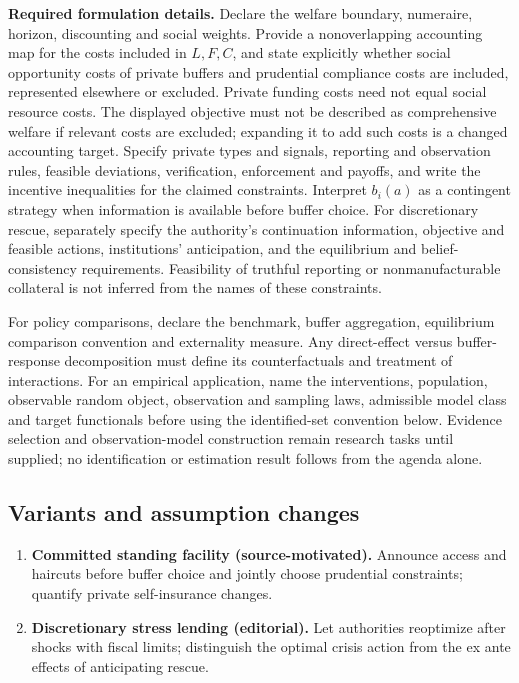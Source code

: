 \documentclass[11pt,a4paper]{article}
\begin{document}
\textbf{Required formulation details.} Declare the welfare boundary, numeraire, horizon, discounting and social weights. Provide a nonoverlapping accounting map for the costs included in \(L,F,C\), and state explicitly whether social opportunity costs of private buffers and prudential compliance costs are included, represented elsewhere or excluded. Private funding costs need not equal social resource costs. The displayed objective must not be described as comprehensive welfare if relevant costs are excluded; expanding it to add such costs is a changed accounting target. Specify private types and signals, reporting and observation rules, feasible deviations, verification, enforcement and payoffs, and write the incentive inequalities for the claimed constraints. Interpret \(b_i(a)\) as a contingent strategy when information is available before buffer choice. For discretionary rescue, separately specify the authority's continuation information, objective and feasible actions, institutions' anticipation, and the equilibrium and belief-consistency requirements. Feasibility of truthful reporting or nonmanufacturable collateral is not inferred from the names of these constraints.

For policy comparisons, declare the benchmark, buffer aggregation, equilibrium comparison convention and externality measure. Any direct-effect versus buffer-response decomposition must define its counterfactuals and treatment of interactions. For an empirical application, name the interventions, population, observable random object, observation and sampling laws, admissible model class and target functionals before using the identified-set convention below. Evidence selection and observation-model construction remain research tasks until supplied; no identification or estimation result follows from the agenda alone.
\subsection*{Variants and assumption changes}
\begin{enumerate}
\item \textbf{Committed standing facility (source-motivated).} Announce access and haircuts before buffer choice and jointly choose prudential constraints; quantify private self-insurance changes.
\item \textbf{Discretionary stress lending (editorial).} Let authorities reoptimize after shocks with fiscal limits; distinguish the optimal crisis action from the ex ante effects of anticipating rescue.
\end{enumerate}
\end{document}
